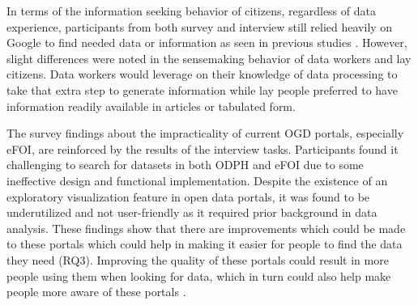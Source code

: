\documentclass{sigchi}
\begin{document}
In terms of the information seeking behavior of citizens, regardless of data experience, participants from both survey and interview still relied heavily on Google to find needed data or information as seen in previous studies \cite{Koesten2017}. However, slight differences were noted in the sensemaking behavior of data workers and lay citizens. Data workers would leverage on their knowledge of data processing to take that extra step to generate information while lay people preferred to have information readily available in articles or tabulated form.

The survey findings about the impracticality of current OGD portals, especially eFOI, are reinforced by the results of the interview tasks. Participants found it challenging to search for datasets in both ODPH and eFOI due to some ineffective design and functional implementation. Despite the existence of an exploratory visualization feature in open data portals, it was found to be underutilized and not user-friendly as it required prior background in data analysis. These findings show that there are improvements which could be made to these portals which could help in making it easier for people to find the data they need (RQ3). Improving the quality of these portals could result in more people using them when looking for data, which in turn could also help make people more aware of these portals \cite{corrales2019knowledge}.


\end{document}
